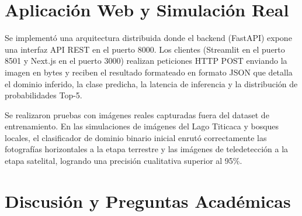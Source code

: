\documentclass[conference,onecolumn]{IEEEtran}
\begin{document}
\section{Aplicación Web y Simulación Real}
Se implementó una arquitectura distribuida donde el backend (FastAPI) expone una interfaz API REST en el puerto 8000. Los clientes (Streamlit en el puerto 8501 y Next.js en el puerto 3000) realizan peticiones HTTP POST enviando la imagen en bytes y reciben el resultado formateado en formato JSON que detalla el dominio inferido, la clase predicha, la latencia de inferencia y la distribución de probabilidades Top-5.

Se realizaron pruebas con imágenes reales capturadas fuera del dataset de entrenamiento. En las simulaciones de imágenes del Lago Titicaca y bosques locales, el clasificador de dominio binario inicial enrutó correctamente las fotografías horizontales a la etapa terrestre y las imágenes de teledetección a la etapa satelital, logrando una precisión cualitativa superior al 95\%.

\section{Discusión y Preguntas Académicas}
\end{document}
